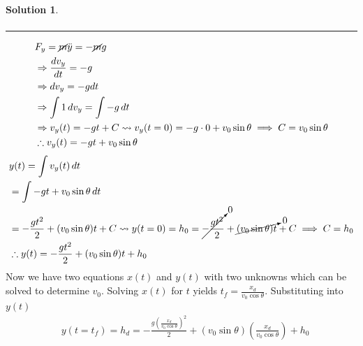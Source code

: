\documentclass[10pt]{article}
\theoremstyle{definition}
\newtheorem{soln}{Solution}
\begin{document}
\begin{soln}
\begin{align*}
     \end{align*}
     \par\noindent\rule{\textwidth}{0.4pt}
     \begin{align*}
           & F_y=\cancel{m}\ddot{y}=-\cancel{m}g                                                                    \\
           & \Rightarrow\displaystyle\frac{dv_y}{dt}=-g                                                             \\
           & \Rightarrow dv_y=-gdt                                                                                  \\
           & \Rightarrow\int 1 \,dv_y = \int -g \,dt                                                                \\
           & \Rightarrow v_y(t)=-gt+C \rightsquigarrow v_y(t=0)=-g\cdot0+{v_0}\sin\theta \implies C={v_0}\sin\theta \\
           & \therefore v_y(t)=-gt+{v_0}\sin\theta                                                                  \\
     \end{align*}
     \begin{align*}
           & y(t)=\int v_y(t) \,dt                                                                                                                             \\
           & =\int -gt+{v_0}\sin\theta \,dt                                                                                                                    \\
           & =-\frac{gt^2}{2}+({v_0}\sin\theta)t+C \rightsquigarrow y(t=0)=h_0=\cancelto{0}{-\frac{gt^2}{2}}+\cancelto{0}{({v_0}\sin\theta)t}+C \implies C=h_0 \\
           & \therefore y(t)=-\frac{gt^2}{2}+({v_0}\sin\theta)t+h_0                                                                                            \\
     \end{align*}
     Now we have two equations $x(t)$ and $y(t)$ with two unknowns which can be solved to determine ${v_0}$. Solving $x(t)$ for $t$ yields $t_{f}=\displaystyle\frac{x_d}{{v_0}\cos\theta}$.
     Substituting into $y(t)$
     \begin{align*}
           & y(t=t_{f})=h_d=-\frac{g\left(\frac{x_d}{{v_0}\cos\theta}\right)^2}{2}+({v_0}\sin\theta)\left(\frac{x_d}{{v_0}\cos\theta}\right)+h_0      \\

\end{align*}
\end{soln}
\end{document}
